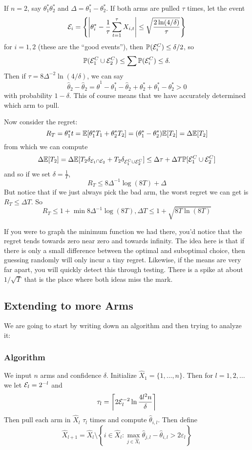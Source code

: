 \documentclass[12pt]{article}
\begin{document}
If $n=2$, say $\theta_1^\ast\theta_2^\ast$ and $\Delta=\theta_1^\ast-\theta_2^\ast$. If both arms are pulled $\tau$ times, let the event
\[\mathcal{E}_i=\left\{\left|\theta_i^\ast-\frac{1}{\tau}\sum_{t=1}^\tau X_{i,t}\right|\le\sqrt{\frac{2\ln (4/\delta)}{\tau}}\right\}\]
for $i=1,2$ (these are the ``good events''), then $\mathbb{P}(\mathcal{E}_i^C)\le\delta/2$, so 
\[\mathbb{P}(\mathcal{E}_1^C\cup\mathcal{E}_2^C)\le\sum\mathbb{P}(\mathcal{E}_i^C)\le\delta.\]
Then if $\tau=8\Delta^{-2}\ln(4/\delta)$, we can say 
\[\hat\theta_2-\hat\theta_2=\hat\theta^1-\theta_1^\ast-\hat\theta_2+\theta_2^\ast+\theta_1^\ast-\theta_2^\ast>0\]
with probability $1-\delta$. This of course means that we have accurately determined which arm to pull.

Now consider the regret:
\[R_T=\theta_1^\ast t=\mathbb{E}[\theta_1^\ast T_1+\theta_2^\ast T_2]=(\theta_1^\ast-\theta_2^\ast)\mathbb{E}[T_2]=\Delta\mathbb{E}[T_2]\]
from which we can compute 
\[\Delta\mathbb{E}[T_2]=\Delta\mathbb{E}[T_2\delta_{\mathcal{E}_1\cap\mathcal{E}_2}+T_2\delta_{\mathcal{E}_1^C\cup \mathcal{E}_2^C}]\le\Delta\tau+\Delta T\mathbb{P}[\mathcal{E}_1^C\cup\mathcal{E}_2^C]\]
and so if we set $\delta=\frac{1}{T}$,
\[R_T\le 8\Delta^{-1}\log(8T)+\Delta\]
But notice that if we just always pick the bad arm, the worst regret we can get is $R_T\le \Delta T$. So 
\[R_T\le1+\min{8\Delta^{-1}\log(8T),\Delta T}\le 1+\sqrt{8T\ln(8T)}\]

If you were to graph the minimum function we had there, you'd notice that the regret tends towards zero near zero and towards infinity. The idea here is that if there is only a small difference between the optimal and suboptimal choice, 
then guessing randomly will only incur a tiny regret. Likewise, if the means are very far apart, you will quickly detect this through testing. There is a spike at about $1/\sqrt{T}$ that is the place where both ideas miss the mark.

\subsection{Extending to more Arms}
We are going to start by writing down an algorithm and then trying to analyze it:

\subsubsection{Algorithm}
We input $n$ arms and confidence $\delta$. Initialize $\hat X_1=\{1,\dots,n\}.$ Then for $l=1,2,\dots$ we let $\mathcal{E}_l=2^{-l}$ and 
\[\tau_l=\left\lceil 2\mathcal{E}_l^{-2}\ln\frac{4 l^2 n}{\delta}\right\rceil\]
Then pull each arm in $\hat X_l$ $\tau_l$ times and compute $\hat\theta_{i,l}$. Then define 
\[\hat X_{l+1}=\hat X_l\setminus\left\{i\in \hat X_l:\max_{j\in\hat X_l}\hat\theta_{j,l}-\hat\theta_{i,l}>2\varepsilon_l\right\}\]
\end{document}
